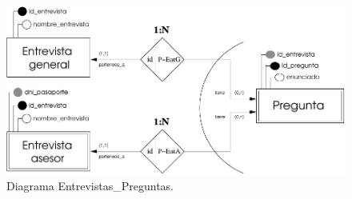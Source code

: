   \begin{figure}[!ht]
    \begin{center}
      \includegraphics[]{10.Disenyo_Datos/10.2.Modelo_Datos_Relacional/Tablas/diagramas/Entrevistas-Pregunta.pdf}
      \caption{Diagrama Entrevistas\_Preguntas.}
      \label{diagramaEntPreg}
    \end{center}
  \end{figure}